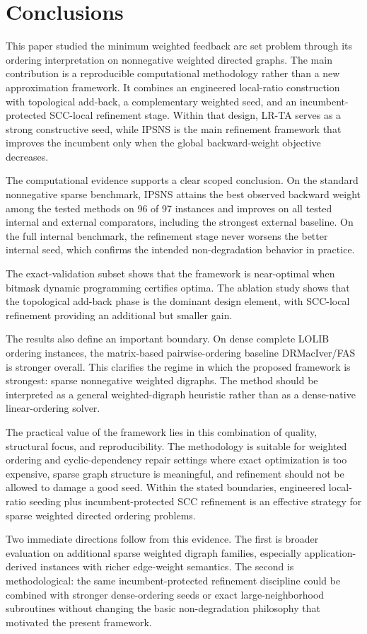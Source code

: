 \section{Conclusions}
\label{sec:conclusion}

This paper studied the minimum weighted feedback arc set problem through its ordering interpretation on nonnegative weighted directed graphs. The main contribution is a reproducible computational methodology rather than a new approximation framework. It combines an engineered local-ratio construction with topological add-back, a complementary weighted seed, and an incumbent-protected SCC-local refinement stage. Within that design, LR-TA serves as a strong constructive seed, while IPSNS is the main refinement framework that improves the incumbent only when the global backward-weight objective decreases.

The computational evidence supports a clear scoped conclusion. On the standard nonnegative sparse benchmark, IPSNS attains the best observed backward weight among the tested methods on 96 of 97 instances and improves on all tested internal and external comparators, including the strongest external baseline. On the full internal benchmark, the refinement stage never worsens the better internal seed, which confirms the intended non-degradation behavior in practice.

The exact-validation subset shows that the framework is near-optimal when bitmask dynamic programming certifies optima. The ablation study shows that the topological add-back phase is the dominant design element, with SCC-local refinement providing an additional but smaller gain.

The results also define an important boundary. On dense complete LOLIB ordering instances, the matrix-based pairwise-ordering baseline DRMacIver/FAS is stronger overall. This clarifies the regime in which the proposed framework is strongest: sparse nonnegative weighted digraphs. The method should be interpreted as a general weighted-digraph heuristic rather than as a dense-native linear-ordering solver.

The practical value of the framework lies in this combination of quality, structural focus, and reproducibility. The methodology is suitable for weighted ordering and cyclic-dependency repair settings where exact optimization is too expensive, sparse graph structure is meaningful, and refinement should not be allowed to damage a good seed. Within the stated boundaries, engineered local-ratio seeding plus incumbent-protected SCC refinement is an effective strategy for sparse weighted directed ordering problems.

Two immediate directions follow from this evidence. The first is broader evaluation on additional sparse weighted digraph families, especially application-derived instances with richer edge-weight semantics. The second is methodological: the same incumbent-protected refinement discipline could be combined with stronger dense-ordering seeds or exact large-neighborhood subroutines without changing the basic non-degradation philosophy that motivated the present framework.
